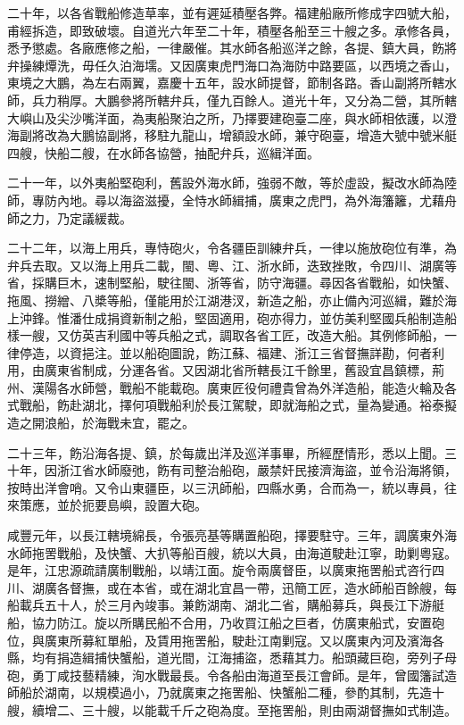 \begin{pinyinscope}
二十年，以各省戰船修造草率，並有遲延積壓各弊。福建船廠所修成字四號大船，甫經拆造，即致破壞。自道光六年至二十年，積壓各船至三十艘之多。承修各員，悉予懲處。各廠應修之船，一律嚴催。其水師各船巡洋之餘，各提、鎮大員，飭將弁操練燂洗，毋任久泊海壖。又因廣東虎門海口為海防中路要區，以西境之香山，東境之大鵬，為左右兩翼，嘉慶十五年，設水師提督，節制各路。香山副將所轄水師，兵力稍厚。大鵬參將所轄弁兵，僅九百餘人。道光十年，又分為二營，其所轄大嶼山及尖沙嘴洋面，為夷船聚泊之所，乃擇要建砲臺二座，與水師相依護，以澄海副將改為大鵬協副將，移駐九龍山，增額設水師，兼守砲臺，增造大號中號米艇四艘，快船二艘，在水師各協營，抽配弁兵，巡緝洋面。

二十一年，以外夷船堅砲利，舊設外海水師，強弱不敵，等於虛設，擬改水師為陸師，專防內地。尋以海盜滋擾，全恃水師緝捕，廣東之虎門，為外海籓籬，尤藉舟師之力，乃定議緩裁。

二十二年，以海上用兵，專恃砲火，令各疆臣訓練弁兵，一律以施放砲位有準，為弁兵去取。又以海上用兵二載，閩、粵、江、浙水師，迭致挫敗，令四川、湖廣等省，採購巨木，速制堅船，駛往閩、浙等省，防守海疆。尋因各省戰船，如快蟹、拖風、撈繒、八槳等船，僅能用於江湖港汊，新造之船，亦止備內河巡緝，難於海上沖鋒。惟潘仕成捐資新制之船，堅固適用，砲亦得力，並仿美利堅國兵船制造船樣一艘，又仿英吉利國中等兵船之式，調取各省工匠，改造大船。其例修師船，一律停造，以資挹注。並以船砲圖說，飭江蘇、福建、浙江三省督撫詳勘，何者利用，由廣東省制成，分運各省。又因湖北省所轄長江千餘里，舊設宜昌鎮標，荊州、漢陽各水師營，戰船不能載砲。廣東匠役何禮貴曾為外洋造船，能造火輪及各式戰船，飭赴湖北，擇何項戰船利於長江駕駛，即就海船之式，量為變通。裕泰擬造之開浪船，於海戰未宜，罷之。

二十三年，飭沿海各提、鎮，於每歲出洋及巡洋事畢，所經歷情形，悉以上聞。三十年，因浙江省水師廢弛，飭有司整治船砲，嚴禁奸民接濟海盜，並令沿海將領，按時出洋會哨。又令山東疆臣，以三汛師船，四縣水勇，合而為一，統以專員，往來策應，並於扼要島嶼，設置大砲。

咸豐元年，以長江轄境綿長，令張亮基等購置船砲，擇要駐守。三年，調廣東外海水師拖罟戰船，及快蟹、大扒等船百艘，統以大員，由海道駛赴江寧，助剿粵寇。是年，江忠源疏請廣制戰船，以靖江面。旋令兩廣督臣，以廣東拖罟船式咨行四川、湖廣各督撫，或在本省，或在湖北宜昌一帶，迅簡工匠，造水師船百餘艘，每船載兵五十人，於三月內竣事。兼飭湖南、湖北二省，購船募兵，與長江下游艇船，協力防江。旋以所購民船不合用，乃收買江船之巨者，仿廣東船式，安置砲位，與廣東所募紅單船，及賃用拖罟船，駛赴江南剿寇。又以廣東內河及濱海各縣，均有捐造緝捕快蟹船，道光間，江海捕盜，悉藉其力。船頭藏巨砲，旁列子母砲，勇丁咸技藝精練，洵水戰最長。令各船由海道至長江會師。是年，曾國籓試造師船於湖南，以規模過小，乃就廣東之拖罟船、快蟹船二種，參酌其制，先造十艘，續增二、三十艘，以能載千斤之砲為度。至拖罟船，則由兩湖督撫如式制造。


\end{pinyinscope}
